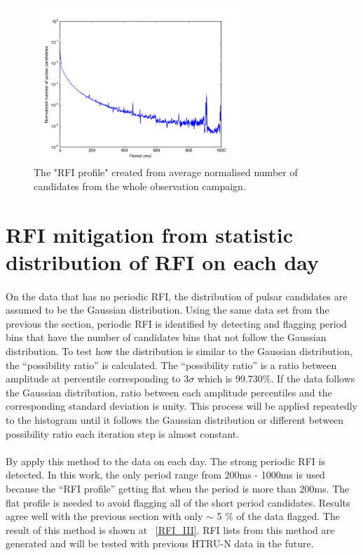 \documentclass[thesis_msc.tex]{subfiles}
\begin{document}
\begin{figure}[h!] 
\centering
\includegraphics[width=0.7\textwidth]{figures/mean_profile.png}
\caption{The "RFI profile" created from average normalised number of candidates from the whole observation campaign.}
\label{RFI_profile}
\end{figure}

    \section{RFI mitigation from statistic distribution of RFI on each day}
    \paragraph{} On the data that has no periodic RFI, the distribution of pulsar candidates are assumed to be the Gaussian distribution. Using the same data set from the previous the section, periodic RFI is identified by detecting and flagging period bins that have the number of candidates bins that not follow the Gaussian distribution. To test how the distribution is similar to the Gaussian distribution, the ``possibility ratio'' is calculated.  The ``possibility ratio'' is a ratio between amplitude at percentile corresponding to $3\sigma$ which is 99.730\%. If the data follows the Gaussian distribution, ratio between each amplitude percentiles and the corresponding standard deviation is unity. This process will be applied repeatedly to the histogram until it follows the Gaussian distribution or different between possibility ratio each iteration step is almost constant.
    \paragraph{} By apply this method to the data on each day. The strong periodic RFI is detected. In this work, the only period range from 200ms - 1000ms is used because the ``RFI profile'' getting flat when the period is more than 200ms. The flat profile is needed to avoid flagging all of the short period candidates. Results agree well with the previous section with only $\sim$ 5 $\%$ of the data flagged. The result of this method is shown at ~\ref{RFI_III}. RFI lists from this method are generated and will be tested with previous HTRU-N data in the future. 
 
\end{document}
